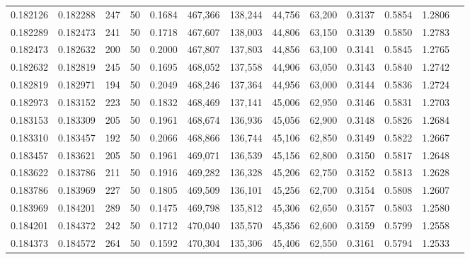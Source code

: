 \begin{tabular}{rrrrrrrrrrrrr}
0.182126 & 0.182288 &   247 &  50 &                                     0.1684 & 467,366 & 138,244 &  44,756 &  63,200 & 0.3137 & 0.5854 & 1.2806 \\
0.182289 & 0.182473 &   241 &  50 &                                     0.1718 & 467,607 & 138,003 &  44,806 &  63,150 & 0.3139 & 0.5850 & 1.2783 \\
0.182473 & 0.182632 &   200 &  50 &                                     0.2000 & 467,807 & 137,803 &  44,856 &  63,100 & 0.3141 & 0.5845 & 1.2765 \\
0.182632 & 0.182819 &   245 &  50 &                                     0.1695 & 468,052 & 137,558 &  44,906 &  63,050 & 0.3143 & 0.5840 & 1.2742 \\
0.182819 & 0.182971 &   194 &  50 &                                     0.2049 & 468,246 & 137,364 &  44,956 &  63,000 & 0.3144 & 0.5836 & 1.2724 \\
0.182973 & 0.183152 &   223 &  50 &                                     0.1832 & 468,469 & 137,141 &  45,006 &  62,950 & 0.3146 & 0.5831 & 1.2703 \\
0.183153 & 0.183309 &   205 &  50 &                                     0.1961 & 468,674 & 136,936 &  45,056 &  62,900 & 0.3148 & 0.5826 & 1.2684 \\
0.183310 & 0.183457 &   192 &  50 &                                     0.2066 & 468,866 & 136,744 &  45,106 &  62,850 & 0.3149 & 0.5822 & 1.2667 \\
0.183457 & 0.183621 &   205 &  50 &                                     0.1961 & 469,071 & 136,539 &  45,156 &  62,800 & 0.3150 & 0.5817 & 1.2648 \\
0.183622 & 0.183786 &   211 &  50 &                                     0.1916 & 469,282 & 136,328 &  45,206 &  62,750 & 0.3152 & 0.5813 & 1.2628 \\
0.183786 & 0.183969 &   227 &  50 &                                     0.1805 & 469,509 & 136,101 &  45,256 &  62,700 & 0.3154 & 0.5808 & 1.2607 \\
0.183969 & 0.184201 &   289 &  50 &                                     0.1475 & 469,798 & 135,812 &  45,306 &  62,650 & 0.3157 & 0.5803 & 1.2580 \\
0.184201 & 0.184372 &   242 &  50 &                                     0.1712 & 470,040 & 135,570 &  45,356 &  62,600 & 0.3159 & 0.5799 & 1.2558 \\
0.184373 & 0.184572 &   264 &  50 &                                     0.1592 & 470,304 & 135,306 &  45,406 &  62,550 & 0.3161 & 0.5794 & 1.2533 \\

\end{tabular}
